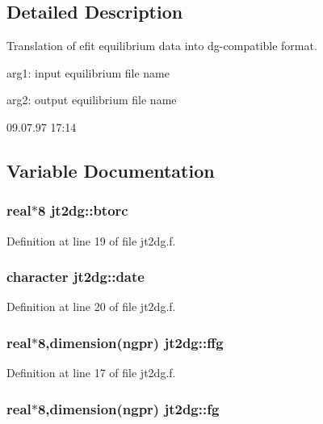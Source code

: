 \subsection{Detailed Description}
Translation of efit equilibrium data into dg-compatible format. 

arg1: input equilibrium file name

arg2: output equilibrium file name

\begin{Desc}
\item[Version:]09.07.97 17:14 \end{Desc}


\subsection{Variable Documentation}
\hypertarget{namespacejt2dg_4d893dd31631d4c355e8ed3d4be79dd7}{
\subsubsection[btorc]{\setlength{\rightskip}{0pt plus 5cm}real$\ast$8 {\bf jt2dg::btorc}}}
\label{namespacejt2dg_4d893dd31631d4c355e8ed3d4be79dd7}




Definition at line 19 of file jt2dg.f.\hypertarget{namespacejt2dg_98bd4e896161de789c7c592b8d610eb2}{
\subsubsection[date]{\setlength{\rightskip}{0pt plus 5cm}character {\bf jt2dg::date}}}
\label{namespacejt2dg_98bd4e896161de789c7c592b8d610eb2}




Definition at line 20 of file jt2dg.f.\hypertarget{namespacejt2dg_80fab5edf3704e21b81149c9e637f497}{
\subsubsection[ffg]{\setlength{\rightskip}{0pt plus 5cm}real$\ast$8,dimension(ngpr) {\bf jt2dg::ffg}}}
\label{namespacejt2dg_80fab5edf3704e21b81149c9e637f497}




Definition at line 17 of file jt2dg.f.\hypertarget{namespacejt2dg_17c615f62c0c05b808d87246266ab536}{
\subsubsection[fg]{\setlength{\rightskip}{0pt plus 5cm}real$\ast$8,dimension(ngpr) {\bf jt2dg::fg}}}
\label{namespacejt2dg_17c615f62c0c05b808d87246266ab536}




